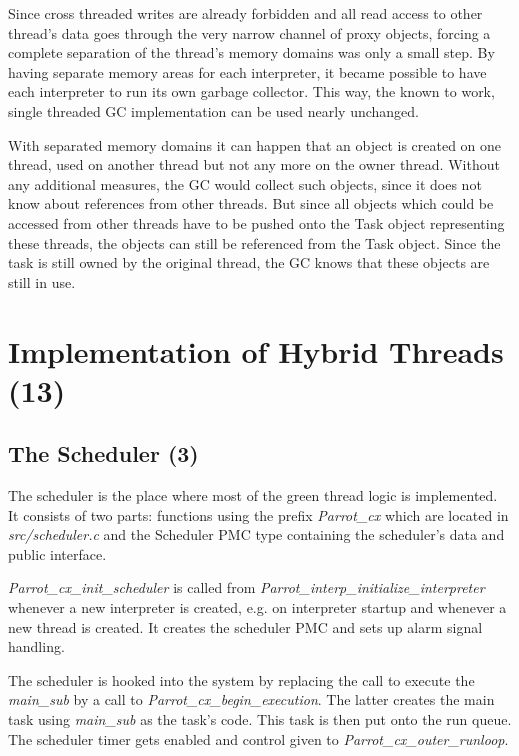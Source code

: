 \documentclass[bachelor,english]{hgbthesis}
\begin{document}
Since cross threaded writes are already forbidden and all read access to other thread's data goes through the very narrow channel of proxy objects, forcing a complete separation of the thread's memory domains was only a small step. By having separate memory areas for each interpreter, it became possible to have each interpreter to run its own garbage collector. This way, the known to work, single threaded GC implementation can be used nearly unchanged.

With separated memory domains it can happen that an object is created on one thread, used on another thread but not any more on the owner thread. Without any additional measures, the GC would collect such objects, since it does not know about references from other threads. But since all objects which could be accessed from other threads have to be pushed onto the Task object representing these threads, the objects can still be referenced from the Task object. Since the task is still owned by the original thread, the GC knows that these objects are still in use.

\chapter{Implementation of Hybrid Threads (13)}

\section{The Scheduler (3)}

The scheduler is the place where most of the green thread logic is implemented. It consists of two parts: functions using the prefix \textit{Parrot\_cx} which are located in \textit{src/scheduler.c} and the Scheduler PMC type containing the scheduler's data and public interface.

\textit{Parrot\_cx\_init\_scheduler} is called from \textit{Parrot\_interp\_initialize\_interpreter} whenever a new interpreter is created, e.g. on interpreter startup and whenever a new thread is created. It creates the scheduler PMC and sets up alarm signal handling.

The scheduler is hooked into the system by replacing the call to execute the \textit{main\_sub} by a call to \textit{Parrot\_cx\_begin\_execution}. The latter creates the main task using \textit{main\_sub} as the task's code. This task is then put onto the run queue. The scheduler timer gets enabled and control given to \textit{Parrot\_cx\_outer\_runloop}.
\end{document}
